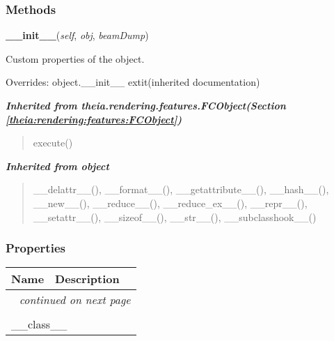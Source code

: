 
  \subsubsection{Methods}

    \vspace{0.5ex}

\hspace{.8\funcindent}\begin{boxedminipage}{\funcwidth}

    \raggedright \textbf{\_\_init\_\_}(\textit{self}, \textit{obj}, \textit{beamDump})

\setlength{\parskip}{2ex}
    Custom properties of the object.

\setlength{\parskip}{1ex}
      Overrides: object.\_\_init\_\_ 	extit{(inherited documentation)}

    \end{boxedminipage}


\large{\textbf{\textit{Inherited from theia.rendering.features.FCObject\textit{(Section \ref{theia:rendering:features:FCObject})}}}}

\begin{quote}
execute()
\end{quote}

\large{\textbf{\textit{Inherited from object}}}

\begin{quote}
\_\_delattr\_\_(), \_\_format\_\_(), \_\_getattribute\_\_(), \_\_hash\_\_(), \_\_new\_\_(), \_\_reduce\_\_(), \_\_reduce\_ex\_\_(), \_\_repr\_\_(), \_\_setattr\_\_(), \_\_sizeof\_\_(), \_\_str\_\_(), \_\_subclasshook\_\_()
\end{quote}


  \subsubsection{Properties}

    \vspace{-1cm}
\hspace{\varindent}\begin{longtable}{|p{\varnamewidth}|p{\vardescrwidth}|l}
\cline{1-2}
\cline{1-2} \centering \textbf{Name} & \centering \textbf{Description}& \\
\cline{1-2}
\endhead\cline{1-2}\multicolumn{3}{r}{\small\textit{continued on next page}}\\\endfoot\cline{1-2}
\endlastfoot\multicolumn{2}{|l|}{\textit{Inherited from object}}\\
\multicolumn{2}{|p{\varwidth}|}{\raggedright \_\_class\_\_}\\
\cline{1-2}
\end{longtable}


